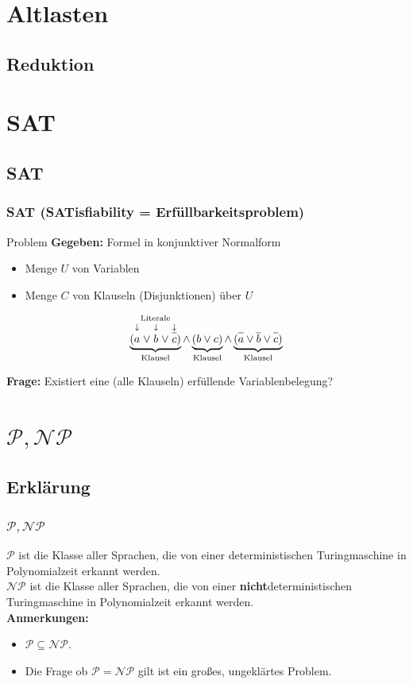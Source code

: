 



\section{Altlasten}
\subsection{Reduktion}

\section{SAT}
\subsection{SAT}
\begin{frame}
\frametitle{SAT (SATisfiability = Erfüllbarkeitsproblem)}
\begin{block}{Problem}
\textbf{Gegeben:} Formel in konjunktiver Normalform
\begin{itemize}
 \item Menge $U$ von Variablen
 \item Menge $C$ von Klauseln (Disjunktionen) über $U$
\end{itemize} $$ \underbrace{(\stackrel{\text{Literale}}{\stackrel{\downarrow}{\vphantom{\neglit{a}}a} \vee \stackrel{\downarrow}{\vphantom{\neglit{b}}b} \vee \stackrel{\downarrow}{\neglit{c}}})}_\text{Klausel} \wedge \underbrace{(b \vee c)}_\text{Klausel} \wedge \underbrace{(\neglit{a} \vee \neglit{b} \vee \neglit{c})}_\text{Klausel}$$

\textbf{Frage:} Existiert eine (alle Klauseln) erfüllende Variablenbelegung?
\end{block}
\end{frame}

\section{$\mathcal{P}, \mathcal{NP}$}
\subsection{Erklärung}
\begin{frame}
	\frametitle{$\mathcal{P}, \mathcal{NP}$}
	\ducttape{1cm}
	$\mathcal{P}$ ist die Klasse aller Sprachen, die von einer deterministischen Turingmaschine in Polynomialzeit erkannt werden.\\
	\ducttape{1cm}
	$\mathcal{NP}$ ist die Klasse aller Sprachen, die von einer \textbf{nicht}deterministischen Turingmaschine in Polynomialzeit erkannt werden.\\
	\ducttape{1cm}
	\textbf{Anmerkungen: }
	\begin{itemize}
		\item $\mathcal{P} \subseteq \mathcal{NP}$.
		\item Die Frage ob $\mathcal{P} = \mathcal{NP}$ gilt ist ein großes, ungeklärtes Problem.
	\end{itemize}
	\end{frame}

